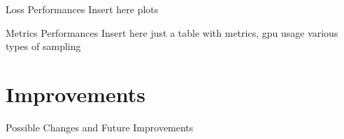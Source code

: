 \documentclass{beamer}
\begin{document}
\begin{frame}{Loss Performances}
Insert here plots
\end{frame}

\begin{frame}{Metrics Performances}
Insert here just a table with metrics, gpu usage
various types of sampling
\end{frame}

\section{Improvements}

\begin{frame}{Possible Changes and Future Improvements}
\end{frame}

\backmatter
\end{document}
